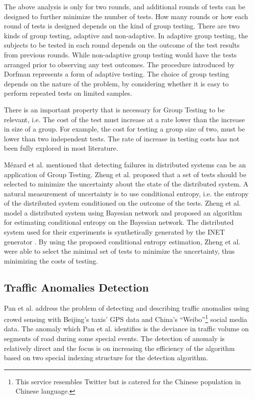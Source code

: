 \documentclass[10pt]{article}
\begin{document}
The above analysis is only for two rounds, and additional rounds of tests can be designed to further minimize the number of tests. How many rounds or how each round of tests is designed depends on the kind of group testing. There are two kinds of group testing, adaptive and non-adaptive. In adaptive group testing, the subjects to be tested in each round depends on the outcome of the test results from previous rounds. While non-adaptive group testing would have the tests arranged prior to observing any test outcomes. The procedure introduced by Dorfman \cite{Dorfman1943} represents a form of adaptive testing. The choice of group testing depends on the nature of the problem, by considering whether it is easy to perform repeated tests on limited samples.

There is an important property that is necessary for Group Testing to be relevant, i.e. The cost of the test must increase at a rate lower than the increase in size of a group. For example, the cost for testing a group size of two, must be lower than two independent tests. The rate of increase in testing costs has not been fully explored in most literature.

M\'{e}zard et al. \cite{Mezard2008} mentioned that detecting failures in distributed systems \cite{Zheng2004,Zheng2005} can be an application of Group Testing. Zheng et al. \cite{Zheng2004,Zheng2005} proposed that a set of tests should be selected to minimize the uncertainty about the state of the distributed system. A natural measurement of uncertainty is to use conditional entropy, i.e. the entropy of the distributed system conditioned on the outcome of the tests. Zheng et al. \cite{Zheng2004,Zheng2005} model a distributed system using Bayesian network and proposed an algorithm for estimating conditional entropy on the Bayesian network. The distributed system used for their experiments is synthetically generated by the INET generator \cite{Winick2002}. By using the proposed conditional entropy estimation, Zheng et al. \cite{Zheng2004,Zheng2005} were able to select the minimal set of tests to minimize the uncertainty, thus minimizing the costs of testing.

\subsection{Traffic Anomalies Detection}

Pan et al. \cite{Pan2013} address the problem of detecting and describing traffic anomalies using crowd sensing with Beijing's taxis' GPS data and China's ``Weibo''\footnote{This service resembles Twitter but is catered for the Chinese population in Chinese language.} social media data. The anomaly which Pan et al. \cite{Pan2013} identifies is the deviance in traffic volume on segments of road during some special events. The detection of anomaly is relatively direct and the focus is on increasing the efficiency of the algorithm based on two special indexing structure for the detection algorithm.
\end{document}
